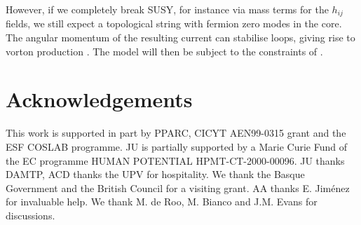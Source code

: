 \documentclass[a4paper,aps,prd,superscriptaddress,floats]{revtex4}
\begin{document}
However, if we completely break SUSY, for instance via mass terms for the $h_{ij}$ fields, we still expect a topological string with fermion zero modes in the core. The angular momentum of the resulting current can stabilise loops, giving rise to vorton production \cite{ADPU02}. The
model will then be subject to the constraints of \cite{chiralvorton}.



\section{Acknowledgements}
This work is supported in part by PPARC, CICYT AEN99-0315 grant 
and the ESF COSLAB programme. JU is partially supported by a Marie Curie Fund 
of the EC programme HUMAN POTENTIAL HPMT-CT-2000-00096.
JU thanks DAMTP, ACD thanks the UPV  for hospitality. 
We thank the Basque Government and the British Council 
for a visiting grant. AA thanks E. Jim\'enez for 
invaluable help. We thank M. de Roo, M. Bianco and J.M. Evans
for discussions.
\end{document}
